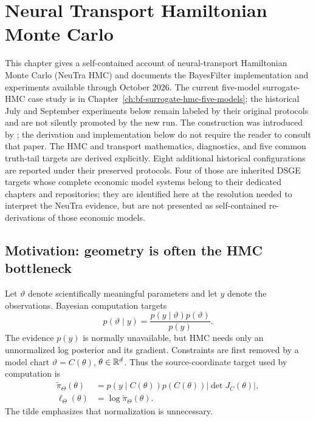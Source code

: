 \chapter{Neural Transport Hamiltonian Monte Carlo}
\label{ch:bf-neutra}

This chapter gives a self-contained account of neural-transport Hamiltonian
Monte Carlo (NeuTra HMC) and documents the BayesFilter implementation and
experiments available through October 2026.  The current five-model
surrogate-HMC case study is in Chapter~\ref{ch:bf-surrogate-hmc-five-models};
the historical July and September experiments below remain labeled by their
original protocols and are not silently promoted by the new run. The construction was introduced by
\citet{hoffman2019neutra}; the derivation and implementation below do not
require the reader to consult that paper.  The HMC and transport mathematics,
diagnostics, and five common truth-tail targets are derived explicitly.  Eight
additional historical configurations are reported under their preserved
protocols.  Four of those are inherited DSGE targets whose complete economic
model systems belong to their dedicated chapters and repositories; they are
identified here at the resolution needed to interpret the NeuTra evidence, but
are not presented as self-contained re-derivations of those economic models.

\section{Motivation: geometry is often the HMC bottleneck}

Let $\vartheta$ denote scientifically meaningful parameters and let $y$ denote
the observations.  Bayesian computation targets
\begin{equation}
 p(\vartheta\mid y)=\frac{p(y\mid\vartheta)p(\vartheta)}{p(y)}.
\end{equation}
The evidence $p(y)$ is normally unavailable, but HMC needs only an unnormalized
log posterior and its gradient.  Constraints are first removed by a model
chart $\vartheta=C(\theta)$, $\theta\in\mathbb{R}^d$.  Thus the source-coordinate target
used by computation is
\begin{align}
 \widetilde\pi_\Theta(\theta)
 &=p(y\mid C(\theta))p(C(\theta))
   \left|\det J_C(\theta)\right|, \\
 \ell_\Theta(\theta)&=\log\widetilde\pi_\Theta(\theta).
 \label{eq:bf-neutra-source-target}
\end{align}
The tilde emphasizes that normalization is unnecessary.

